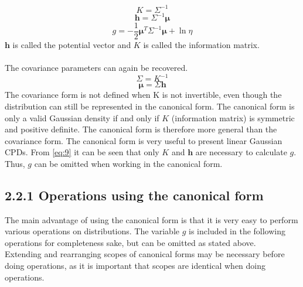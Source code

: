 \documentclass[12pt,oneside,openany,a4paper, %
afrikaans,english,
]{memoir}
\numberwithin{equation}{chapter}
\begin{document}
\begin{equation}\label{eq:7}
K = \Sigma^{-1}
\end{equation}
\begin{equation}\label{eq:8}
\bm{h} = \Sigma^{-1}\bm{\mu}
\end{equation}
\begin{equation}\label{eq:9}
g = - \frac{1}{2}\bm{\mu}^T\Sigma^{-1}\bm{\mu} + \ln{\eta}
\end{equation}
$\bm{h}$ is called the potential vector and $K$ is called the information matrix.\\\\
The covariance parameters can again be recovered. 
\begin{equation}
\Sigma = K^{-1}
\end{equation}
\begin{equation}
\bm{\mu} = \Sigma\bm{h}
\end{equation}
The covariance form is not defined when K is not invertible, even though the distribution can still be represented in the canonical form. The canonical form is only a valid Gaussian density if and only if $K$ (information matrix) is symmetric and positive definite. The canonical form is therefore more general than the covariance form. The canonical form is very useful to present linear Gaussian CPDs. From \ref{eq:9} it can be seen that only $K$ and $\bm{h}$ are necessary to calculate $g$. Thus, $g$ can be omitted when working in the canonical form. \\


\subsection{2.2.1 Operations using the canonical form}
The main advantage of using the canonical form is that it is very easy to perform various operations on distributions. The variable $g$ is included in the following operations for completeness sake, but can be omitted as stated above.\\

Extending and rearranging scopes of canonical forms may be necessary before doing operations, as it is important that scopes are identical when doing operations.
\end{document}
